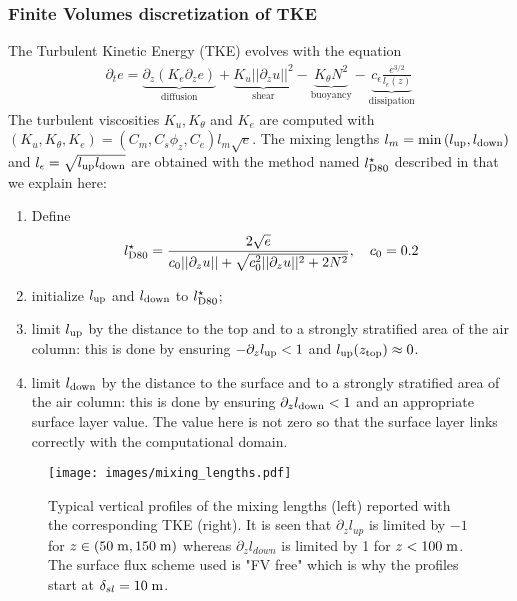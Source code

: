 \subsubsection{Finite Volumes discretization of TKE}
\label{sec:ND_StratifiedCase_TKE}
The Turbulent Kinetic Energy (TKE) evolves with the equation
\begin{equation}
\label{eq:ND_StratifiedCase_TKE}
    \begin{aligned}
    \partial_t e =
    \underbrace{\partial_z \left(K_e
    \partial_z e\right)}_{\text{diffusion}}
    + \underbrace{K_u ||\partial_z u||^2}_{\text{shear}} 
    - \underbrace{K_{\theta} N^2 }_{\text{buoyancy}}
    - \underbrace{c_{\epsilon}
    \frac{e^{3/2}}{l_{\epsilon}(z)}}_{\text{dissipation}}
    \end{aligned}
\end{equation}
The turbulent viscosities $K_u, K_{\theta}$ and $K_e$ are computed
with $(K_u, K_\theta, K_e) = (C_m , C_s \phi_z, C_e)l_m \sqrt{e}$.
The mixing lengths $l_m = \min{(l_{\rm up}, l_{\rm down})}$ and
$l_\epsilon = \sqrt{l_{\rm up} l_{\rm down}}$
are obtained with the method named $l^\star_{\rm D80}$ described in
\cite{lemarie_simplified_2021} that we explain here:
\begin{enumerate}
	\item Define
		\begin{equation}
			\label{eq:ND_StratifiedCase_lD80}
			l^\star_{\rm D80} = \frac{2\sqrt{e}}
			{c_0 ||\partial_z u|| + \sqrt{
				c_0^2 ||\partial_z u||^2 + 2 N^2
			}}, ~~~ c_0=0.2
		\end{equation}
	\item initialize $l_{\rm up}$ and $l_{\rm down}$ to
		$l^\star_{\rm D80}$;
	\item limit $l_{\rm up}$ by the distance to the top and to
		a strongly stratified area of the air column:
		this is done by ensuring $-\partial_z l_{\rm up} < 1$
		and $l_{\rm up}(z_{\rm top}) \approx 0$.
	\item limit $l_{\rm down}$ by the distance to the surface
		and to a strongly stratified area of the air column:
		this is done by ensuring $\partial_z l_{\rm down} < 1$
		and an appropriate surface layer value.
		The value here is not zero so that the surface layer
		links correctly with the computational domain.
\end{enumerate}
\begin{figure}
	\centering
	\texttt{[image: images/mixing\_lengths.pdf]}
	\caption{Typical vertical profiles of the mixing lengths
	(left) reported with the corresponding TKE (right).
	It is seen that $\partial_z l_{up}$ is limited by $-1$
	for $z\in (50 \; {\rm m}, 150\; {\rm m})$ whereas
	$\partial_z l_{down}$ is limited by 1 for $z<100 \;{\rm m}$.
	The surface flux scheme used is "FV free" which is why the
	profiles start at $\delta_{sl} = 10\;{\rm m}$.}
	\label{fig:ND_StratifiedCase_mixing_lengths}
\end{figure}
